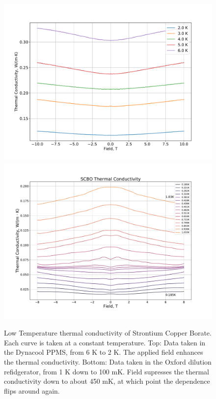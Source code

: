 \documentclass{thesis-umich}
\begin{document}
\begin{figure}
	\centering
	\caption[Low Temperature Thermal Conductivity of SCBO]{Low Temperature thermal conductivity of Strontium Copper Borate. Each curve is taken at a constant temperature. Top: Data taken in the Dynacool PPMS, from 6 K to 2 K. The applied field enhances the thermal conductivity. Bottom: Data taken in the Oxford dilution refidgerator, from 1 K down to 100 mK. Field supresses the thermal conductivity down to about 450 mK, at which point the dependence flips around again.}
	\label{fig:SCBO_kappa_xx}
	\includegraphics[width=0.9\columnwidth,trim={1cm 1cm 1cm 1cm},clip]{figures/SCBO_tcond_high.pdf}
	\includegraphics[width=0.9\columnwidth,trim={1cm 1cm 1cm 1cm},clip]{figures/SCBO_kappa_xx_vs_B_1.pdf}
\end{figure}
\end{document}
